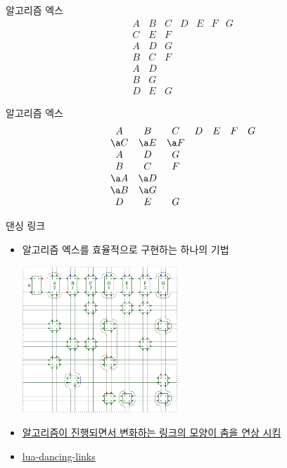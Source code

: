 \documentclass[xcolor=svgnames]{beamer}
\begin{document}
\renewcommand\arraystretch{1.2}
%
\begin{frame}{알고리즘 엑스}
  \Large\boldmath
  $$
  \begin{array}{ccccccc}
    A & B & C & D & E & F & G\\
    C & E & F &&&&\\
    A & D & G &&&&\\
    B & C & F &&&&\\
    A & D &&&&&\\
    B & G &&&&&\\
    D & E & G &&&&
  \end{array}
  $$
\end{frame}

%
\begin{frame}{알고리즘 엑스}
  \Large\boldmath
  $$
  \begin{array}{ccccccc}
    A & B & C & D & E & F & G\\
    \a C & \a E & \a F &&&&\\
    A & D & G &&&&\\
    B & C & F &&&&\\
    \a A & \a D &&&&&\\
    \a B & \a G &&&&&\\
    D & E & G &&&&
  \end{array}
  $$
\end{frame}

%
\begin{frame}{댄싱 링크}
  \begin{itemize}
  \item 알고리즘 엑스를 효율적으로 구현하는 하나의 기법

    \begin{center}
      \includegraphics[height=55mm]{imgs/cdance-4.png}
    \end{center}

  \item \href{https://www.youtube.com/watch?v=pN76VICZiKU&start=100}
    {알고리즘이 진행되면서 변화하는 링크의 모양이 춤을 연상 시킴}
  \item \href{https://github.com/sjnam/lua-dancing-links}
    {lua-dancing-links}
  \end{itemize}
\end{frame}
\end{document}
